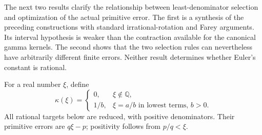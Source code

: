 \documentclass[11pt,a4paper]{article}
\theoremstyle{definition}
\theoremstyle{remark}
\begin{document}
The next two results clarify the relationship between least-denominator
selection and optimization of the actual primitive error. The first is a
synthesis of the preceding constructions with standard irrational-rotation
and Farey arguments. Its interval hypothesis is weaker than the contraction
available for the canonical gamma kernels. The second shows that the two
selection rules can nevertheless have arbitrarily different finite errors.
Neither result determines whether Euler's constant is rational.

For a real number $\xi$, define
\[
 \kappa(\xi)=
 \begin{cases}
  0,&\xi\notin\mathbb Q,\\
  1/b,&\xi=a/b\text{ in lowest terms, }b>0.
 \end{cases}
\]
All rational targets below are reduced, with positive denominators. Their
primitive errors are $q\xi-p$; positivity follows from $p/q<\xi$.
\end{document}
